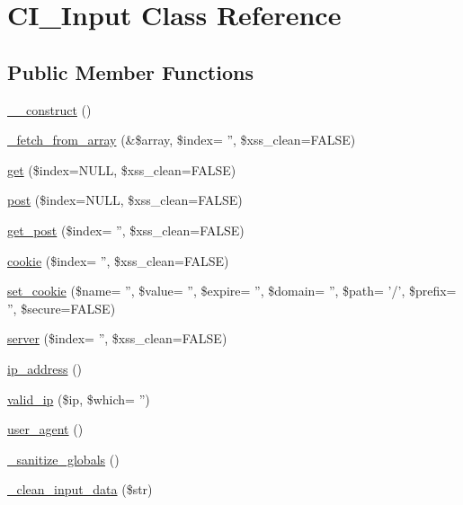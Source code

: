 \hypertarget{class_c_i___input}{\section{C\-I\-\_\-\-Input Class Reference}
\label{class_c_i___input}
}
\subsection*{Public Member Functions}
\begin{DoxyCompactItemize}
\item 
\hyperlink{class_c_i___input_a095c5d389db211932136b53f25f39685}{\-\_\-\-\_\-construct} ()
\item 
\hyperlink{class_c_i___input_a206046338a68072d20b5bde395c42cd7}{\-\_\-fetch\-\_\-from\-\_\-array} (\&\$array, \$index= '', \$xss\-\_\-clean=F\-A\-L\-S\-E)
\item 
\hyperlink{class_c_i___input_a7f3fe35f15454cbad4f12fd8a0e195e1}{get} (\$index=N\-U\-L\-L, \$xss\-\_\-clean=F\-A\-L\-S\-E)
\item 
\hyperlink{class_c_i___input_a50ac0e340a9da4d85cc976e78d99a7c0}{post} (\$index=N\-U\-L\-L, \$xss\-\_\-clean=F\-A\-L\-S\-E)
\item 
\hyperlink{class_c_i___input_aec54f245bc5c3215ba81a594ed858b2f}{get\-\_\-post} (\$index= '', \$xss\-\_\-clean=F\-A\-L\-S\-E)
\item 
\hyperlink{class_c_i___input_a60e581edbf6507bf0702fd5212ac79a4}{cookie} (\$index= '', \$xss\-\_\-clean=F\-A\-L\-S\-E)
\item 
\hyperlink{class_c_i___input_aae6a307dce00b4d06a29c6f0be9e4b59}{set\-\_\-cookie} (\$name= '', \$value= '', \$expire= '', \$domain= '', \$path= '/', \$prefix= '', \$secure=F\-A\-L\-S\-E)
\item 
\hyperlink{class_c_i___input_ae51c4a35daae69cbec7a25a5309918d9}{server} (\$index= '', \$xss\-\_\-clean=F\-A\-L\-S\-E)
\item 
\hyperlink{class_c_i___input_aec2f772317b4fb79cc696412c2e455c3}{ip\-\_\-address} ()
\item 
\hyperlink{class_c_i___input_a2adf8f23c98fcdafdc7588f874db4c4d}{valid\-\_\-ip} (\$ip, \$which= '')
\item 
\hyperlink{class_c_i___input_a638069c4ba0d3f4209c6936e5282f170}{user\-\_\-agent} ()
\item 
\hyperlink{class_c_i___input_aadbb0e5cbf9b5783c872cb402ea6a2fa}{\-\_\-sanitize\-\_\-globals} ()
\item 
\hyperlink{class_c_i___input_a9c594152e7b189a290f6425df8712b73}{\-\_\-clean\-\_\-input\-\_\-data} (\$str)

\end{DoxyCompactItemize}
